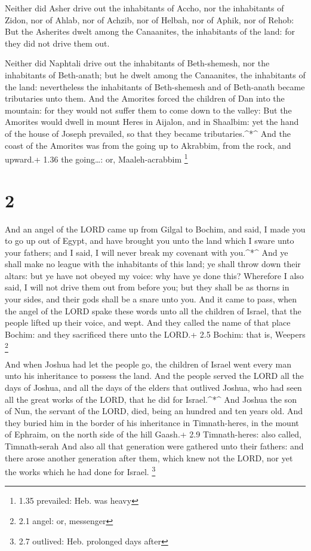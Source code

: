  Neither did Asher drive out the inhabitants of Accho, nor
the inhabitants of Zidon, nor of Ahlab, nor of Achzib, nor of Helbah,
nor of Aphik, nor of Rehob:  But the Asherites dwelt among
the Canaanites, the inhabitants of the land: for they did not drive them
out.

 Neither did Naphtali drive out the inhabitants of
Beth-shemesh, nor the inhabitants of Beth-anath; but he dwelt among the
Canaanites, the inhabitants of the land: nevertheless the inhabitants of
Beth-shemesh and of Beth-anath became tributaries unto them.
 And the Amorites forced the children of Dan into the
mountain: for they would not suffer them to come down to the valley:
 But the Amorites would dwell in mount Heres in Aijalon,
and in Shaalbim: yet the hand of the house of Joseph prevailed, so that
they became tributaries.\^{}*\^{}  And the coast of the
Amorites was from the going up to Akrabbim, from the rock, and upward.+
1.36 the going\ldots: or, Maaleh-acrabbim \footnote{1.35 prevailed: Heb.
  was heavy}

\hypertarget{section-1}{%
\section{2}\label{section-1}}

 And an angel of the LORD came up from Gilgal to Bochim, and
said, I made you to go up out of Egypt, and have brought you unto the
land which I sware unto your fathers; and I said, I will never break my
covenant with you.\^{}*\^{}  And ye shall make no league
with the inhabitants of this land; ye shall throw down their altars: but
ye have not obeyed my voice: why have ye done this? 
Wherefore I also said, I will not drive them out from before you; but
they shall be as thorns in your sides, and their gods shall be a snare
unto you.  And it came to pass, when the angel of the LORD
spake these words unto all the children of Israel, that the people
lifted up their voice, and wept.  And they called the name
of that place Bochim: and they sacrificed there unto the LORD.+ 2.5
Bochim: that is, Weepers \footnote{2.1 angel: or, messenger}

 And when Joshua had let the people go, the children of
Israel went every man unto his inheritance to possess the land.
 And the people served the LORD all the days of Joshua, and
all the days of the elders that outlived Joshua, who had seen all the
great works of the LORD, that he did for Israel.\^{}*\^{} 
And Joshua the son of Nun, the servant of the LORD, died, being an
hundred and ten years old.  And they buried him in the
border of his inheritance in Timnath-heres, in the mount of Ephraim, on
the north side of the hill Gaash.+ 2.9 Timnath-heres: also called,
Timnath-serah  And also all that generation were gathered
unto their fathers: and there arose another generation after them, which
knew not the LORD, nor yet the works which he had done for Israel.
\footnote{2.7 outlived: Heb. prolonged days after}

